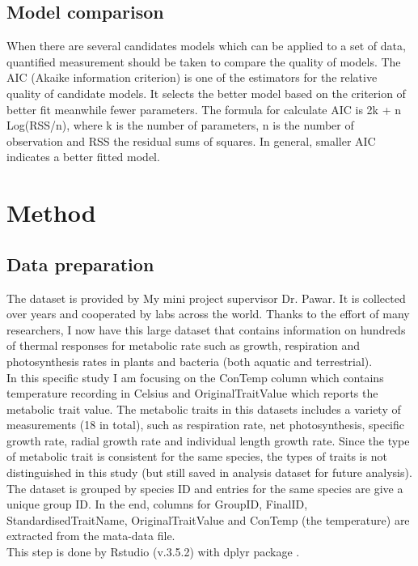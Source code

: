 \documentclass[12pt,a4paper]{article}
\begin{document}
\subsection{Model comparison}
When there are several candidates models which can be applied to a set of data, quantified measurement should be taken to compare the quality of models. The AIC (Akaike information criterion) is one of the estimators for the relative quality of candidate models. It selects the better model based on the criterion of better fit meanwhile fewer parameters. The formula for calculate AIC is 2k + n Log(RSS/n), where k is the number of parameters, n is the number of observation and RSS the residual sums of squares. In general, smaller AIC indicates a better fitted model.
\cite{modelselection}
\section{Method}
\subsection{Data preparation}
The dataset is provided by My mini project supervisor Dr. Pawar. It is collected over years and cooperated by labs across the world. Thanks to the effort of many researchers, I now have this large dataset that contains information on hundreds of thermal responses for metabolic rate such as growth, respiration and photosynthesis rates in plants and bacteria (both aquatic and terrestrial).
\\
In this specific study I am focusing on the ConTemp column which contains temperature recording in Celsius and OriginalTraitValue which reports the metabolic trait value. The metabolic traits in this datasets includes a variety of measurements (18 in total), such as respiration rate, net photosynthesis, specific growth rate, radial growth rate and individual length growth rate. 
Since the type of metabolic trait is consistent for the same species, the types of traits is not distinguished in this study (but still saved in analysis dataset for future analysis). The dataset is grouped by species ID and entries for the same species are give a unique group ID. In the end, columns for GroupID, FinalID, StandardisedTraitName, OriginalTraitValue and ConTemp (the temperature) are extracted from the mata-data file.
\\
This step is done by Rstudio (v.3.5.2) \cite{Rstudio} with dplyr package \cite{dplyr}.
\end{document}
